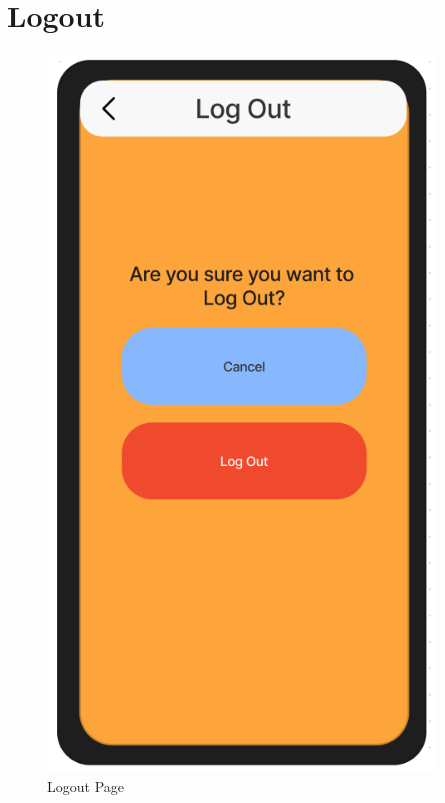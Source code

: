 \documentclass[title page]{article}
\begin{document}
\section{Logout}
\begin{figure}[!h]
    \begin{center}
          \includegraphics[height=19cm]{logout.png}
          \caption{Logout Page}
          \label{fig:logout}
    \end{center}
\end{figure}
\end{document}

